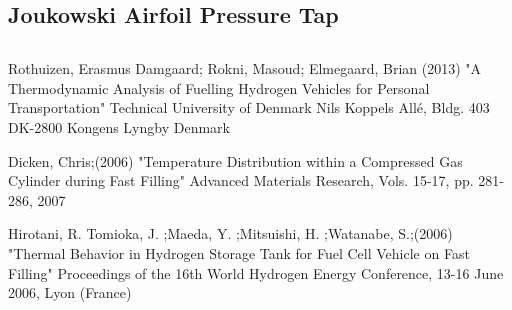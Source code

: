 \documentclass[paper=a4, fontsize=11pt, abstract=on]{scrartcl}
\numberwithin{equation}{section}		%
\numberwithin{figure}{section}			%
\numberwithin{table}{section}				%
\begin{document}
\subsection{Joukowski Airfoil Pressure Tap}



\subsection{}




\begin{thebibliography}{99} %
 Rothuizen, Erasmus Damgaard; Rokni, Masoud; Elmegaard, Brian (2013)
\newblock "A Thermodynamic Analysis of Fuelling Hydrogen Vehicles for Personal Transportation" Technical University of Denmark
\newblock Nils Koppels Allé, Bldg. 403 DK-2800 Kongens Lyngby Denmark


 Dicken, Chris;(2006)
\newblock "Temperature Distribution within a Compressed Gas Cylinder during Fast Filling"
\newblock  Advanced Materials Research, Vols. 15-17, pp. 281-286, 2007 


 Hirotani, R.
Tomioka, J. ;Maeda, Y. ;Mitsuishi, H. ;Watanabe, S.;(2006)
\newblock "Thermal Behavior in Hydrogen Storage Tank for Fuel Cell Vehicle on Fast Filling"
\newblock  Proceedings of the 16th World Hydrogen Energy Conference, 13-16 June 2006, Lyon (France)


\end{thebibliography}


\end{document}
